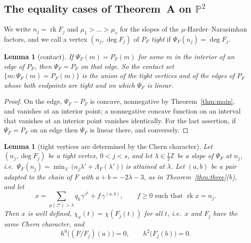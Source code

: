 \documentclass[11pt]{amsart}
\newtheorem{lemma}[theorem]{Lemma}
\theoremstyle{definition}
\theoremstyle{remark}
\newcommand{\PP}{\mathbb{P}}
\newcommand{\ZZ}{\mathbb{Z}}
\DeclareMathOperator{\rk}{rk}
\begin{document}
\subsection{The equality cases of Theorem~A on \texorpdfstring{$\PP^2$}{P2}}\label{sec:equality}
We write $n_j=\rk F_j$ and $\mu_1>\dots>\mu_s$ for the slopes of the $\mu$-Harder--Narasimhan factors, and we call a vertex $(n_j,\deg F_j)$ of $P_F$ \emph{tight} if $\Psi_F(n_j)=\deg F_j$.

\begin{lemma}[contact]\label{lem:contact}
If $\Psi_F(m)=P_F(m)$ for some $m$ in the interior of an edge of $P_F$, then $\Psi_F=P_F$ on that edge. So the contact set $\{m:\Psi_F(m)=P_F(m)\}$ is the union of the tight vertices and of the edges of $P_F$ whose both endpoints are tight and on which $\Psi_F$ is linear.
\end{lemma}

\begin{proof}
On the edge, $\Psi_F-P_F$ is concave, nonnegative by Theorem~\ref{thm:main}, and vanishes at an interior point; a nonnegative concave function on an interval that vanishes at an interior point vanishes identically. For the last assertion, if $\Psi_F=P_F$ on an edge then $\Psi_F$ is linear there, and conversely.
\end{proof}

\begin{lemma}[tight vertices are determined by the Chern character]\label{lem:Ktight}
Let $(n_j,\deg F_j)$ be a tight vertex, $0<j<s$, and let $\lambda\in\frac12\ZZ$ be a slope of $\Psi_F$ at $n_j$, i.e.\ $\Psi_F(n_j)=\min_{\lambda'}\big(n_j\lambda'+\Lambda_F(\lambda')\big)$ is attained at $\lambda$. Let $(a,b)$ be a pair adapted to the chain of $F$ with $a+b=-2\lambda-3$, as in Theorem~\textup{\ref{thm:three}(b)}, and let
\[
x=\sum_{\mu(z^k)>\lambda}q_k\gamma^{z^k}+f\,\gamma^{(a,b)},\qquad f\ge0 \text{ such that } \rk x=n_j .
\]
Then $x$ is well defined, $\chi_x(t)=\chi(F_j(t))$ for all $t$, i.e.\ $x$ and $F_j$ have the same Chern character, and
\[
h^0\big((F/F_j)(a)\big)=0,\qquad h^2\big(F_j(b)\big)=0 .
\]
\end{lemma}
\end{document}
